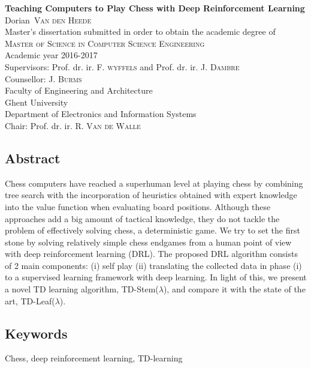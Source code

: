 \newpage
\vspace*{2cm}
\begingroup
    \fontsize{11pt}{13.2pt}\selectfont


\begin{center}
    \textbf{{\huge  Teaching Computers to Play Chess with Deep Reinforcement Learning}}\\[.5em]
   
    Dorian~\textsc{Van den Heede}\\[.5em]
   
    Master's dissertation submitted in order to obtain the academic degree of\\[.1em]\textsc{Master of Science in Computer Science Engineering}\\[.5em]
   
    Academic year 2016-2017\\[.5em]
   
    {Supervisors:} Prof. dr. ir. F. \textsc{wyffels} and Prof. dr. ir. J. \textsc{Dambre}\\[.1em]
    {Counsellor:} J. \textsc{Burms}\\[.5em]
 
    Faculty of Engineering and Architecture\\[.1em]
    Ghent University\\[.5em]
   
    Department of Electronics and Information Systems\\[.1em]
    Chair: Prof. dr. ir. R. \textsc{Van de Walle}
\end{center}
 
 
\setlength{\parskip}{1.5ex}
 
\subsection*{Abstract}
 
Chess computers have reached a superhuman level at playing chess by combining tree search with the incorporation of heuristics obtained with expert knowledge into the value function when evaluating board positions. Although these approaches add a big amount of tactical knowledge, they do not tackle the problem of effectively solving chess, a deterministic game. We try to set the first stone by solving relatively simple chess endgames from a human point of view with deep reinforcement learning (DRL). The proposed DRL algorithm consists of 2 main components: (i) self play (ii) translating the collected data in phase (i) to a supervised learning framework with deep learning. In light of this, we present a novel TD learning algorithm, TD-Stem($\lambda$), and compare it with the state of the art, TD-Leaf($\lambda$).
 
\setlength{\parskip}{0ex}
 
\subsection*{Keywords}
 
Chess, deep reinforcement learning, TD-learning